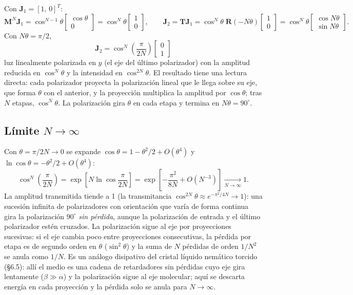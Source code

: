 \documentclass{article}
\newcommand{\Jv}{\mathbf{J}}
\newcommand{\Tm}{\mathbf{T}}
\newcommand{\Rm}{\mathbf{R}}
\begin{document}
Con $\Jv_1=[1,\,0]^T$:
\[
\mathbf M^N\Jv_1=\cos^{N-1}\theta\begin{bmatrix}\cos\theta\\0\end{bmatrix}=\cos^N\theta\begin{bmatrix}1\\0\end{bmatrix},
\qquad
\Jv_2=\Tm\Jv_1=\cos^N\theta\;\Rm(-N\theta)\begin{bmatrix}1\\0\end{bmatrix}
=\cos^N\theta\begin{bmatrix}\cos N\theta\\ \sin N\theta\end{bmatrix}.
\]
Con $N\theta=\pi/2$,
\[
\boxed{\;\Jv_2=\cos^N\!\left(\frac{\pi}{2N}\right)\begin{bmatrix}0\\1\end{bmatrix}\;}
\]
luz linealmente polarizada en $y$ (el eje del último polarizador) con la amplitud reducida en
$\cos^N\theta$ y la intensidad en $\cos^{2N}\theta$. El resultado tiene una lectura directa: cada
polarizador proyecta la polarización lineal que le llega sobre su eje, que forma $\theta$ con el
anterior, y la proyección multiplica la amplitud por $\cos\theta$; tras $N$ etapas, $\cos^N\theta$.
La polarización gira $\theta$ en cada etapa y termina en $N\theta=90^\circ$.

\subsection*{Límite $N\to\infty$}

Con $\theta=\pi/2N\to0$ se expande $\cos\theta=1-\theta^2/2+O(\theta^4)$ y
$\ln\cos\theta=-\theta^2/2+O(\theta^4)$:
\[
\cos^N\!\left(\frac{\pi}{2N}\right)=\exp\!\left[N\ln\cos\frac{\pi}{2N}\right]
=\exp\!\left[-\frac{\pi^2}{8N}+O\!\left(N^{-3}\right)\right]\xrightarrow[N\to\infty]{}1 .
\]
La amplitud transmitida tiende a 1 (la transmitancia $\cos^{2N}\theta\approx e^{-\pi^2/4N}\to1$):
una sucesión infinita de polarizadores con orientación que varía de forma continua gira la
polarización $90^\circ$ \emph{sin pérdida}, aunque la polarización de entrada y el último polarizador estén
cruzados. La polarización sigue al eje por proyecciones sucesivas: si el eje cambia poco entre
proyecciones consecutivas, la pérdida por etapa es de segundo orden en $\theta$ ($\sin^2\theta$) y la suma de
$N$ pérdidas de orden $1/N^2$ se anula como $1/N$. Es un análogo disipativo del cristal
líquido nemático torcido (§6.5): allí el medio es una cadena de retardadores sin pérdidas cuyo eje
gira lentamente ($\beta\gg\alpha$) y la polarización sigue al eje molecular; aquí se descarta
energía en cada proyección y la pérdida solo se anula para $N\to\infty$.
\end{document}
